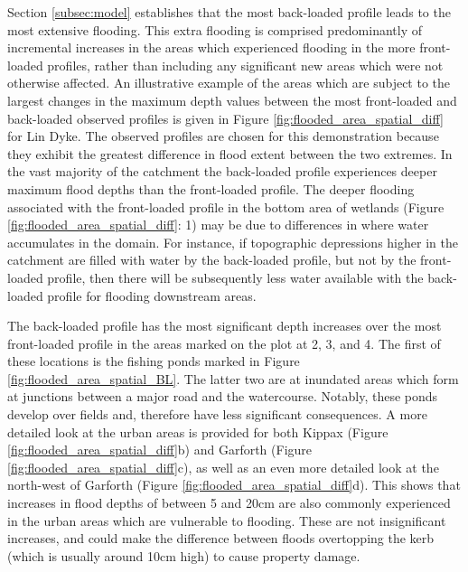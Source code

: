 \documentclass[APA,Times2COL]{WileyNJDv5}
\begin{document}
Section \ref{subsec:model} establishes that the most back-loaded profile leads to the most extensive flooding. This extra flooding is comprised predominantly of incremental increases in the areas which experienced flooding in the more front-loaded profiles, rather than including any significant new areas which were not otherwise affected. An illustrative example of the areas which are subject to the largest changes in the maximum depth values between the most front-loaded and back-loaded observed profiles is given in Figure \ref{fig:flooded_area_spatial_diff} for Lin Dyke. The observed profiles are chosen for this demonstration because they exhibit the greatest difference in flood extent between the two extremes. In the vast majority of the catchment the back-loaded profile experiences deeper maximum flood depths than the front-loaded profile. The deeper flooding associated with the front-loaded profile in the bottom area of wetlands (Figure \ref{fig:flooded_area_spatial_diff}: 1) may be due to differences in where water accumulates in the domain. For instance, if topographic depressions higher in the catchment are filled with water by the back-loaded profile, but not by the front-loaded profile, then there will be subsequently less water available with the back-loaded profile for flooding downstream areas.



The back-loaded profile has the most significant depth increases over the most front-loaded profile in the areas marked on the plot at 2, 3, and 4. The first of these locations is the fishing ponds marked in Figure \ref{fig:flooded_area_spatial_BL}. The latter two are at inundated areas which form at junctions between a major road and the watercourse. Notably, these ponds develop over fields and, therefore have less significant consequences. A more detailed look at the urban areas is provided for both Kippax (Figure \ref{fig:flooded_area_spatial_diff}b) and Garforth (Figure \ref{fig:flooded_area_spatial_diff}c), as well as an even more detailed look at the north-west of Garforth (Figure \ref{fig:flooded_area_spatial_diff}d). This shows that increases in flood depths of between 5 and 20cm are also commonly experienced in the urban areas which are vulnerable to flooding. These are not insignificant increases, and could make the difference between floods overtopping the kerb (which is usually around 10cm high) to cause property damage. 
\end{document}
